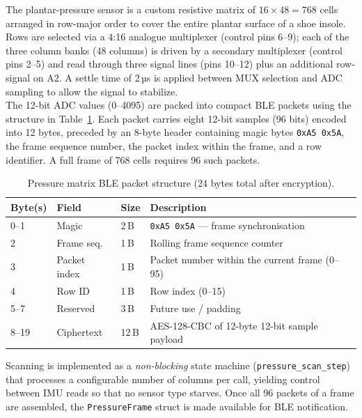 \noindent The plantar-pressure sensor is a custom resistive matrix of $16 \times 48 = 768$ cells arranged in row-major order to cover the entire plantar surface of a shoe insole.  Rows are selected via a 4:16 analogue multiplexer (control pins 6–9); each of the three column banks (48 columns)
is driven by a secondary multiplexer (control pins 2–5) and read through three signal lines
(pins 10–12) plus an additional row-signal on A2.  A settle time of 2\,µs is applied between
MUX selection and ADC sampling to allow the signal to stabilize. \\

\noindent The 12-bit ADC values (0–4095) are packed into compact BLE packets using the structure in
Table~\ref{tab:pressure_packet}.  Each packet carries eight 12-bit samples (96 bits) encoded into
12 bytes, preceded by an 8-byte header containing magic bytes \texttt{0xA5~0x5A}, the frame
sequence number, the packet index within the frame, and a row identifier.  A full frame of 768
cells requires 96 such packets. \\

\begin{table}[htbp]
  \centering
  \caption{Pressure matrix BLE packet structure (24 bytes total after encryption).}
  \label{tab:pressure_packet}
  \begin{tabularx}{\textwidth}{l l l X}
    \hline
    \textbf{Byte(s)} & \textbf{Field} & \textbf{Size} & \textbf{Description} \\
    \hline
    0–1   & Magic         & 2\,B  & \texttt{0xA5 0x5A} — frame synchronisation \\
    2     & Frame seq.    & 1\,B  & Rolling frame sequence counter \\
    3     & Packet index  & 1\,B  & Packet number within the current frame (0–95) \\
    4     & Row ID        & 1\,B  & Row index (0–15) \\
    5–7   & Reserved      & 3\,B  & Future use / padding \\
    8–19  & Ciphertext    & 12\,B & AES-128-CBC of 12-byte 12-bit sample payload \\
    \hline
  \end{tabularx}
\end{table}

\noindent Scanning is implemented as a \textit{non-blocking} state machine (\texttt{pressure\_scan\_step})
that processes a configurable number of columns per call, yielding control between IMU reads so
that no sensor type starves.  Once all 96 packets of a frame are assembled, the \texttt{PressureFrame} struct is made available for BLE notification. \\



